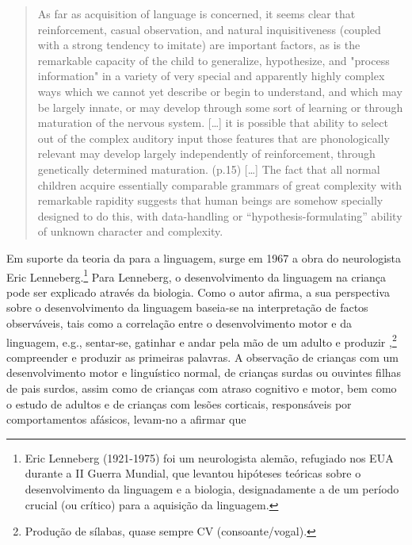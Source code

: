 \documentclass[output=paper]{LSP/langsci}
\begin{document}
\begin{quote}
As far as acquisition of language is concerned, it seems clear that reinforcement, casual observation, and natural inquisitiveness (coupled with a strong tendency to imitate) are important factors, as is the remarkable capacity of the child to generalize, hypothesize, and "process information" in a variety of very special and apparently highly complex ways which we cannot yet describe or begin to understand, and which may be largely innate, or may develop through some sort of learning or through maturation of the nervous system. [\ldots] it is possible that ability to select out of the complex auditory input those features that are phonologically relevant may develop largely independently of reinforcement, through genetically determined maturation. (p.15) [\ldots] The fact that all normal children acquire essentially comparable grammars of great complexity with remarkable rapidity suggests that human beings are somehow specially designed to do this, with data-handling or ``hypothesis-formulating'' ability of unknown character and complexity. \citep[50]{chomsky1959}
\end{quote}

Em suporte da teoria da  para a linguagem, surge em 1967 a obra  do neurologista Eric Lenneberg.\footnote{Eric Lenneberg (1921-1975) foi um neurologista alemão, refugiado nos EUA durante a II Guerra Mundial, que levantou hipóteses teóricas sobre o desenvolvimento da linguagem e a biologia, designadamente a de um período crucial (ou crítico) para a aquisição da linguagem.} Para Lenneberg, o desenvolvimento da linguagem na criança pode ser explicado através da biologia. Como o autor afirma, a sua perspectiva sobre o desenvolvimento da linguagem baseia-se na interpretação de factos observáveis, tais como a correlação entre o desenvolvimento motor e  da linguagem, e.g., sentar-se, gatinhar e andar pela mão de um adulto e produzir ,\footnote{Produção de sílabas, quase sempre CV (consoante/vogal).} compreender e produzir as primeiras palavras. A observação de crianças com um desenvolvimento motor e linguístico normal, de crianças surdas ou ouvintes filhas de pais surdos, assim como de crianças com atraso cognitivo e motor, bem como o estudo de adultos e de crianças com lesões corticais, responsáveis por comportamentos afásicos, levam-no a afirmar que
\end{document}
